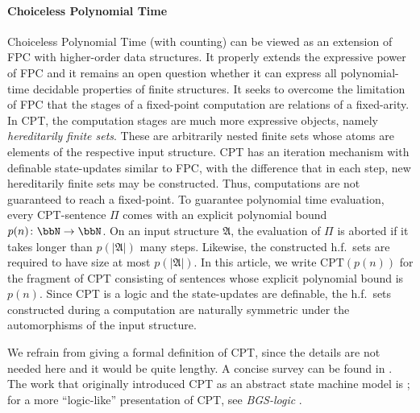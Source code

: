 \documentclass[10pt,a4paper]{article}
\newcommand{\CPT}{\mathrm{CPT}}
\renewcommand{\AA}{{\mathfrak A}}
\begin{document}
	
	\paragraph*{Choiceless Polynomial Time}
	Choiceless Polynomial Time (with counting) can be viewed as an extension of FPC with higher-order data structures.  It properly extends the expressive power of FPC and it remains an open question whether it can express all polynomial-time decidable properties of finite structures.  It seeks to overcome the limitation of FPC that the stages of a fixed-point computation are relations of a fixed-arity. In CPT, the computation stages are much more expressive objects, namely \emph{hereditarily finite sets}. These are arbitrarily nested finite sets whose atoms are elements of the respective input structure.   CPT has an iteration mechanism with definable state-updates similar to FPC, with the difference that in each step, new hereditarily finite sets may be constructed. Thus, computations are not guaranteed to reach a fixed-point. To guarantee polynomial time evaluation, every CPT-sentence $\Pi$ comes with an explicit polynomial bound $p(n) \colon \bbN \to \bbN$. On an input structure $\AA$, the evaluation of $\Pi$ is aborted if it takes longer than $p(|\AA|)$ many steps. Likewise, the constructed h.f.\ sets are required to have size at most $p(|\AA|)$. 
	In this article, we write $\CPT(p(n))$ for the fragment of CPT consisting of sentences whose explicit polynomial bound is $p(n)$.
	Since CPT is a logic and the state-updates are definable, the h.f.\ sets constructed during a computation are naturally symmetric under the automorphisms of the input structure.
	
	
	We refrain from giving a formal definition of CPT, since the details are not needed here and it would be quite lengthy. 
	A concise survey can be found in \cite{gradel2015polynomial}. The work that originally introduced CPT as an abstract state machine model is \cite{CPT}; for a more ``logic-like'' presentation of CPT, see \emph{BGS-logic} \cite{rossman2010choiceless}.
	
	
\end{document}
